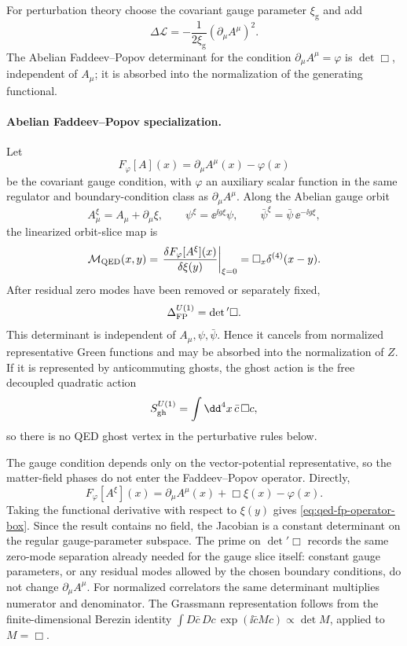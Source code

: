 For perturbation theory choose the covariant gauge parameter
\(\xi_{\mathrm g}\) and add
\[
  \Delta\mathcal L
  =
  -\frac{1}{2\xi_{\mathrm g}}(\partial_\mu A^\mu)^2 .
\]
The Abelian Faddeev--Popov determinant for the condition
\(\partial_\mu A^\mu=\varphi\) is \(\det\Box\), independent of \(A_\mu\);
it is absorbed into the normalization of the generating functional.

\paragraph{Abelian Faddeev--Popov specialization.}
Let
\[
  F_\varphi[A](x)=\partial_\mu A^\mu(x)-\varphi(x)
\]
be the covariant gauge condition, with \(\varphi\) an auxiliary scalar
function in the same regulator and boundary-condition class as
\(\partial_\mu A^\mu\).  Along the Abelian gauge orbit
\[
  A_\mu^\xi=A_\mu+\partial_\mu\xi,
  \qquad
  \psi^\xi=\ee^{\ii g\xi}\psi,
  \qquad
  \bar\psi^\xi=\bar\psi\,\ee^{-\ii g\xi},
\]
the linearized orbit-slice map is
\begin{equation}
  \mathcal M_{\rm QED}(x,y)
  =
  \left.
  \frac{\delta F_\varphi[A^\xi](x)}{\delta\xi(y)}
  \right|_{\xi=0}
  =
  \Box_x\delta^{(4)}(x-y).
  \label{eq:qed-fp-operator-box}
\end{equation}
After residual zero modes have been removed or separately fixed,
\[
  \Delta_{\rm FP}^{U(1)}=\det{}'\Box .
\]
This determinant is independent of \(A_\mu,\psi,\bar\psi\).  Hence it cancels
from normalized representative Green functions and may be absorbed into the
normalization of \(Z\).  If it is represented by anticommuting ghosts, the
ghost action is the free decoupled quadratic action
\[
  S_{\rm gh}^{U(1)}
  =
  \int\dd^4x\,\bar c\,\Box c ,
\]
so there is no QED ghost vertex in the perturbative rules below.

The gauge condition depends only on the vector-potential representative, so
the matter-field phases do not enter the Faddeev--Popov operator.  Directly,
\[
  F_\varphi[A^\xi](x)
  =
  \partial_\mu A^\mu(x)+\Box\xi(x)-\varphi(x).
\]
Taking the functional derivative with respect to \(\xi(y)\) gives
\eqref{eq:qed-fp-operator-box}.  Since the result contains no field, the
Jacobian is a constant determinant on the regular gauge-parameter subspace.
The prime on \(\det{}'\Box\) records the same zero-mode separation already
needed for the gauge slice itself: constant gauge parameters, or any residual
modes allowed by the chosen boundary conditions, do not change
\(\partial_\mu A^\mu\).  For normalized correlators the same determinant
multiplies numerator and denominator.  The Grassmann representation follows
from the finite-dimensional Berezin identity
\(\int D\bar c\,Dc\,\exp(\ii\bar cMc)\propto\det M\), applied to
\(M=\Box\).

